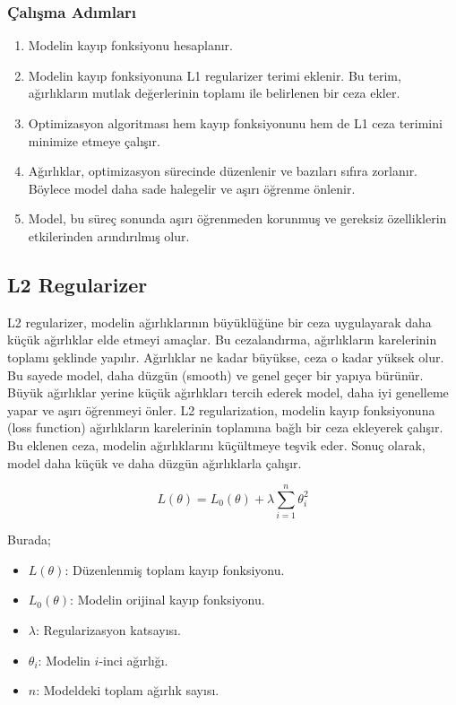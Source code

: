 \subsubsection{Çalışma Adımları}

\begin{enumerate}
    \item Modelin kayıp fonksiyonu hesaplanır.
    \item Modelin kayıp fonksiyonuna L1 regularizer terimi eklenir. Bu terim, ağırlıkların mutlak değerlerinin toplamı ile belirlenen bir ceza ekler.
    \item Optimizasyon algoritması hem kayıp fonksiyonunu hem de L1 ceza terimini minimize etmeye çalışır.
    \item Ağırlıklar, optimizasyon sürecinde düzenlenir ve bazıları sıfıra zorlanır. Böylece model daha sade halegelir ve aşırı öğrenme önlenir.
    \item Model, bu süreç sonunda aşırı öğrenmeden korunmuş ve gereksiz özelliklerin etkilerinden arındırılmış olur.
\end{enumerate}

\newpage

\subsection{L2 Regularizer}

L2 regularizer, modelin ağırlıklarının büyüklüğüne bir ceza uygulayarak daha küçük ağırlıklar elde etmeyi amaçlar. Bu cezalandırma, ağırlıkların karelerinin toplamı şeklinde yapılır. Ağırlıklar ne kadar büyükse, ceza o kadar yüksek olur. Bu sayede model, daha düzgün (smooth) ve genel geçer bir yapıya bürünür. Büyük ağırlıklar yerine küçük ağırlıkları tercih ederek model, daha iyi genelleme yapar ve aşırı öğrenmeyi önler. L2 regularization, modelin kayıp fonksiyonuna (loss function) ağırlıkların karelerinin toplamına bağlı bir ceza ekleyerek çalışır. Bu eklenen ceza, modelin ağırlıklarını küçültmeye teşvik eder. Sonuç olarak, model daha küçük ve daha düzgün ağırlıklarla çalışır.

\[ L(\theta) = L_{0}(\theta) + \lambda \sum_{i = 1}^{n} \theta_{i}^2 \]

Burada;

\begin{itemize}
    \item $L(\theta)$: Düzenlenmiş toplam kayıp fonksiyonu.
    \item $L_{0}(\theta)$: Modelin orijinal kayıp fonksiyonu.
    \item $\lambda$: Regularizasyon katsayısı.
    \item $\theta_{i}$: Modelin $i$-inci ağırlığı.
    \item $n$: Modeldeki toplam ağırlık sayısı.
\end{itemize}

